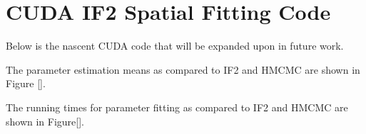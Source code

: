 \section{CUDA IF2 Spatial Fitting Code}

	Below is the nascent CUDA code that will be expanded upon in future work.

	

	The parameter estimation means as compared to IF2 and HMCMC are shown in Figure [].


	The running times for parameter fitting as compared to IF2 and HMCMC are shown in Figure[].